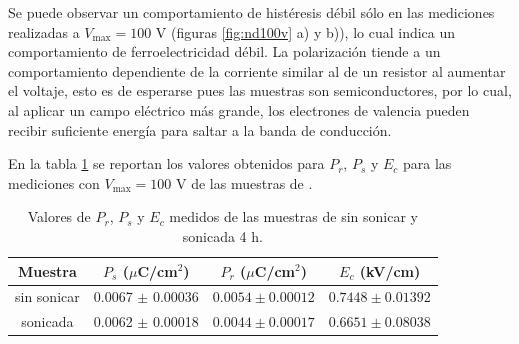 \documentclass[../main.tex]{subfiles}
\begin{document}
Se puede observar un comportamiento de histéresis débil sólo en las mediciones realizadas a $V_\text{max}=100$ V (figuras \ref{fig:nd100v} a) y b)), lo cual indica un comportamiento de ferroelectricidad débil. La polarización tiende a un comportamiento dependiente de la corriente similar al de un resistor al aumentar el voltaje, esto es de esperarse pues las muestras son semiconductores, por lo cual, al aplicar un campo eléctrico más grande, los electrones de valencia pueden recibir suficiente energía para saltar a la banda de conducción.

En la tabla \ref{tabla:respolarneod} se reportan los valores obtenidos para $P_r$, $P_s$ y $E_c$ para las mediciones con $V_\text{max}=100$ V de las muestras de \neod{}.

\begin{table}[H]
    \centering
    \begin{tabular}{|c||c|c|c|}
        \hline
        Muestra & $P_s$ ($\mu$C/cm$^2$) & $P_r$ ($\mu$C/cm$^2$) & $E_c$ (kV/cm) \\
        \hline\hline
        \neod{} sin sonicar & 0.0067 $\pm$ 0.00036 & $0.0054 \pm 0.00012$ & $0.7448 \pm 0.01392$ \\
        \hline
        \neod{} sonicada & 0.0062 $\pm$ 0.00018 & $0.0044 \pm 0.00017$ & $0.6651 \pm 0.08038$ \\
        \hline
        \end{tabular} 
    \caption{Valores de $P_r$, $P_s$ y $E_c$ medidos de las muestras de \neod{} sin sonicar y sonicada 4 h.}
    \label{tabla:respolarneod}
\end{table}
\subsection{\texorpdfstring{\sama{}}{SmFeO3}}
\end{document}
